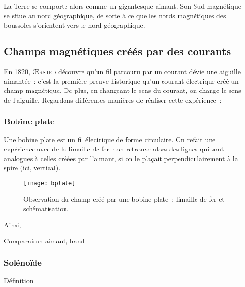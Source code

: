 \documentclass[../main/main.tex]{subfiles}
\begin{document}
La Terre se comporte alors comme un gigantesque aimant. Son Sud magnétique se
situe au nord géographique, de sorte à ce que les nords magnétiques des
boussoles s'orientent vers le nord géographique.

\subsection{Champs magnétiques créés par des courants}
\label{ssec:chpcour}

En 1820, \textsc{Œrsted} découvre qu'un fil parcouru par un courant dévie une
aiguille aimantée~: c'est la première preuve historique qu'un courant électrique
créé un champ magnétique. De plus, en changeant le sens du courant, on change le
sens de l'aiguille. Regardons différentes manières de réaliser cette
expérience~:

\subsubsection{Bobine plate}
\label{sssec:bplate}
Une bobine plate est un fil électrique de forme circulaire. On refait une
expérience avec de la limaille de fer~: on retrouve alors des lignes qui sont
analogues à celles créées par l'aimant, si on le plaçait perpendiculairement à
la spire (ici, vertical).

\begin{figure}[h]
  \centering
  \texttt{[image: bplate]}

  \caption{Observation du champ créé par une bobine plate~: limaille de fer et
  schématisation.}
  \label{fig:bplate}
\end{figure}
Ainsi,
\begin{tprop}{Comparaison aimant, hand}
  \begin{center}
  \end{center}
\end{tprop}

\subsubsection{Solénoïde}
\label{sssec:solen}
\begin{tdefi}{Définition}
  \begin{center}
  \end{center}
\end{tdefi}
\end{document}

